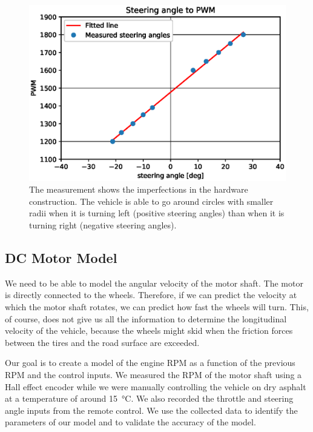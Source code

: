 \begin{figure}
	\includegraphics[width=\textwidth]{../img/steering_angle_to_pwm}
	\caption{The measurement shows the imperfections in the hardware construction. The vehicle is able to go around circles with smaller radii when it is turning left (positive steering angles) than when it is turning right (negative steering angles).}
	\label{fig:steering_angle_to_pwm}
\end{figure}

\subsection{DC Motor Model}

We need to be able to model the angular velocity of the motor shaft. The motor is directly connected to the wheels. Therefore, if we can predict the velocity at which the motor shaft rotates, we can predict how fast the wheels will turn. This, of course, does not give us all the information to determine the longitudinal velocity of the vehicle, because the wheels might skid when the friction forces between the tires and the road surface are exceeded.

Our goal is to create a model of the engine RPM as a function of the previous \gls{RPM} and the control inputs. We measured the RPM of the motor shaft using a Hall effect encoder while we were manually controlling the vehicle on dry asphalt at a temperature of around \SI{15}{\degreeCelsius}. We also recorded the throttle and steering angle inputs from the remote control. We use the collected data to identify the parameters of our model and to validate the accuracy of the model.

